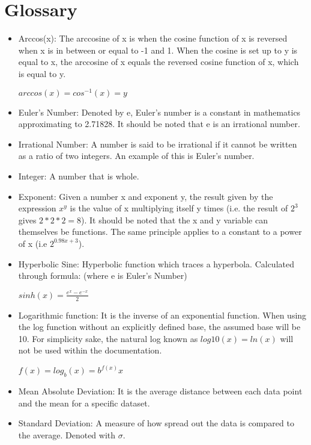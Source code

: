 \section{Glossary}
    \begin{itemize}
        \item Arccos(x): The arccosine of x is when the cosine function of x is reversed when x is in between or equal to -1 and 1. When the cosine is set up to y is equal to x, the arccosine of x equals the reversed cosine function of x, which is equal to y. \cite{arccos}
        \begin{center}
            $arccos(x) = cos^{-1}(x) = y$
        \end{center}
        \item Euler’s Number: Denoted by e, Euler’s number is a constant in mathematics approximating to 2.71828. It should be noted that e is an irrational number.\cite{boundless}
        \item Irrational Number: A number is said to be irrational if it cannot be written as a ratio of two integers. An example of this is Euler’s number. \cite{wolfram}
        \item Integer: A number that is whole. \cite{merriam}
        \item Exponent: Given a number x and exponent y, the result given by the expression $x^y$ is the value of x multiplying itself y times (i.e. the result of $2^3$ gives $2 * 2 * 2 = 8$). It should be noted that the x and y variable can themselves be functions. The same principle applies to a constant to a power of x (i.e $2^{0.98x+3}$).
        \item Hyperbolic Sine: Hyperbolic function which traces a hyperbola. Calculated through formula: (where e is Euler’s Number) \cite{encyclopaedia}
        \begin{center}
            $sinh(x) =  \frac{e^x - e^{-x}} {2}$
        \end{center}
        \item Logarithmic function: It is the inverse of an exponential function. When using the log function without an explicitly defined base, the assumed base will be 10. For simplicity sake, the natural log known as $log10(x) = ln(x)$ will not be used within the documentation.\cite{dawkins}
        \begin{center}
            $f(x) = log_b(x) = b^{f(x)}x$
        \end{center}
        \item  Mean Absolute Deviation: It is the average distance between each data point and the mean for a specific dataset. \cite{khan}
        \item Standard Deviation: A measure of how spread out the data is compared to the average. Denoted with $\sigma$. \cite{students}
    \end{itemize}
